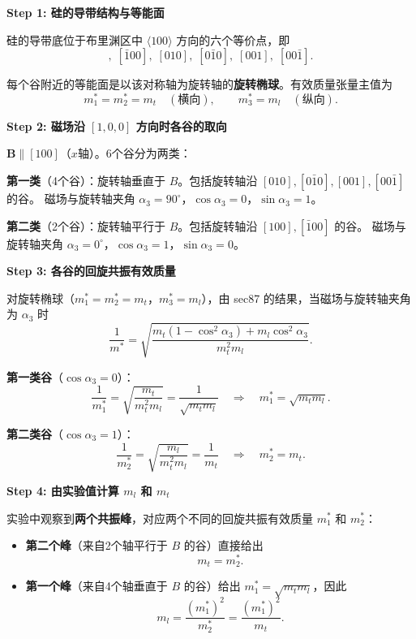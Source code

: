 \begin{derivationbox}[标准解题过程]
\textbf{Step 1: 硅的导带结构与等能面}

硅的导带底位于布里渊区中 $\langle100\rangle$ 方向的六个等价点，即
\begin{equation}
[100],\;[\bar100],\;[010],\;[0\bar10],\;[001],\;[00\bar1].
\end{equation}

每个谷附近的等能面是以该对称轴为旋转轴的\textbf{旋转椭球}。有效质量张量主值为
\begin{equation}
m_1^*=m_2^*=m_t\quad(\text{横向}),\qquad m_3^*=m_l\quad(\text{纵向}).
\end{equation}

\textbf{Step 2: 磁场沿 $[1,0,0]$ 方向时各谷的取向}

$\bm{B}\parallel[100]$（$x$轴）。6个谷分为两类：

\textbf{第一类}（4个谷）：旋转轴垂直于 $B$。包括旋转轴沿 $[010],[0\bar10],[001],[00\bar1]$ 的谷。
磁场与旋转轴夹角 $\alpha_3=90^\circ$，$\cos\alpha_3=0$，$\sin\alpha_3=1$。

\textbf{第二类}（2个谷）：旋转轴平行于 $B$。包括旋转轴沿 $[100],[\bar100]$ 的谷。
磁场与旋转轴夹角 $\alpha_3=0^\circ$，$\cos\alpha_3=1$，$\sin\alpha_3=0$。

\textbf{Step 3: 各谷的回旋共振有效质量}

对旋转椭球（$m_1^*=m_2^*=m_t$，$m_3^*=m_l$），由 sec87 的结果，当磁场与旋转轴夹角为 $\alpha_3$ 时
\begin{equation}
\frac{1}{m^*}=\sqrt{\frac{m_t(1-\cos^2\alpha_3)+m_l\cos^2\alpha_3}{m_t^2m_l}}.
\end{equation}

\textbf{第一类谷}（$\cos\alpha_3=0$）：
\begin{equation}
\frac{1}{m_1^*}=\sqrt{\frac{m_t}{m_t^2m_l}}=\frac{1}{\sqrt{m_tm_l}}
\quad\Longrightarrow\quad
m_1^*=\sqrt{m_tm_l}.
\end{equation}

\textbf{第二类谷}（$\cos\alpha_3=1$）：
\begin{equation}
\frac{1}{m_2^*}=\sqrt{\frac{m_l}{m_t^2m_l}}=\frac{1}{m_t}
\quad\Longrightarrow\quad
m_2^*=m_t.
\end{equation}

\textbf{Step 4: 由实验值计算 $m_l$ 和 $m_t$}

实验中观察到\textbf{两个共振峰}，对应两个不同的回旋共振有效质量 $m_1^*$ 和 $m_2^*$：
\begin{itemize}
    \item \textbf{第二个峰}（来自2个轴平行于 $B$ 的谷）直接给出
    \begin{equation}
    \boxed{m_t=m_2^*.}
    \end{equation}
    \item \textbf{第一个峰}（来自4个轴垂直于 $B$ 的谷）给出 $m_1^*=\sqrt{m_tm_l}$，因此
    \begin{equation}
    \boxed{m_l=\frac{(m_1^*)^2}{m_2^*}=\frac{(m_1^*)^2}{m_t}.}
    \end{equation}
\end{itemize}
\end{derivationbox}

